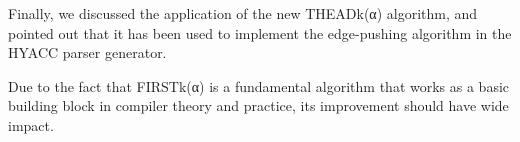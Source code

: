 \documentclass{sig-alternate-05-2015}
\begin{document}
Finally, we discussed the application of the new
THEADk(α) algorithm, and pointed out that it has been
used to implement the edge-pushing algorithm in the HYACC
parser generator.

Due to the fact that FIRSTk(α) is a fundamental algorithm
that works as a basic building block in compiler theory
and practice, its improvement should have wide impact.


%

%
%
\end{document}
